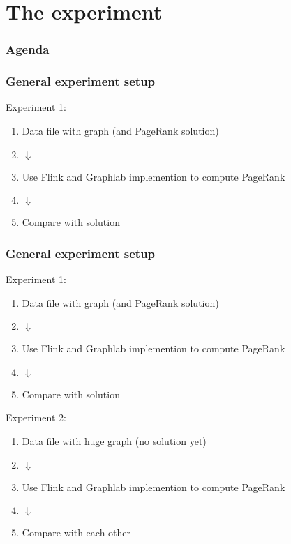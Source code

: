 \section{The experiment}

\begin{frame}
\frametitle{Agenda}
\tableofcontents[currentsection]
\end{frame}

\begin{frame}
\frametitle{General experiment setup}
Experiment 1:
\begin{enumerate}
\item Data file with graph (and PageRank solution)
\item[] $\Downarrow$
\item Use Flink and Graphlab implemention to compute PageRank
\item[] $\Downarrow$
\item Compare with solution
\end{enumerate}

\end{frame}


\begin{frame}
\frametitle{General experiment setup}
Experiment 1:
\begin{enumerate}
\item Data file with graph (and PageRank solution)
\item[] $\Downarrow$
\item Use Flink and Graphlab implemention to compute PageRank
\item[] $\Downarrow$
\item Compare with solution
\end{enumerate}

Experiment 2:

\begin{enumerate}
\item Data file with huge graph (no solution yet)
\item[] $\Downarrow$
\item Use Flink and Graphlab implemention to compute PageRank
\item[] $\Downarrow$
\item Compare with each other
\end{enumerate}
\end{frame}

